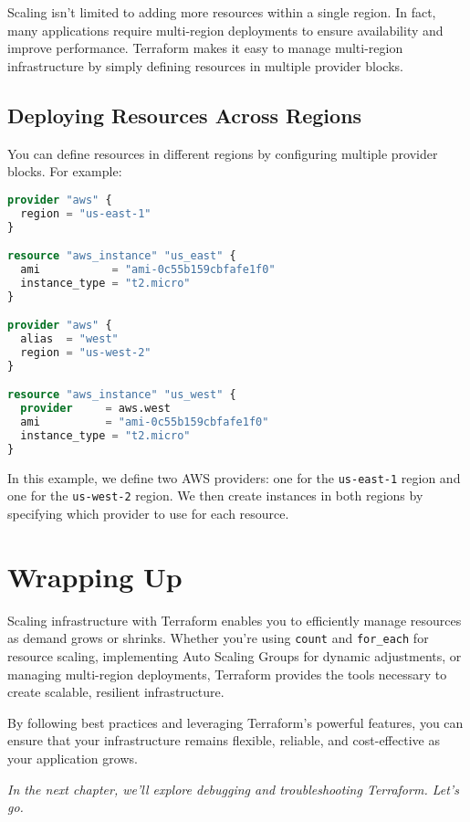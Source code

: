 Scaling isn't limited to adding more resources within a single region. In fact, many applications require multi-region deployments to ensure availability and improve performance. Terraform makes it easy to manage multi-region infrastructure by simply defining resources in multiple provider blocks.

\subsection{Deploying Resources Across Regions}

You can define resources in different regions by configuring multiple provider blocks. For example:

\begin{lstlisting}[language=terraform]
provider "aws" {
  region = "us-east-1"
}

resource "aws_instance" "us_east" {
  ami           = "ami-0c55b159cbfafe1f0"
  instance_type = "t2.micro"
}

provider "aws" {
  alias  = "west"
  region = "us-west-2"
}

resource "aws_instance" "us_west" {
  provider     = aws.west
  ami          = "ami-0c55b159cbfafe1f0"
  instance_type = "t2.micro"
}
\end{lstlisting}

In this example, we define two AWS providers: one for the \texttt{us-east-1} region and one for the \texttt{us-west-2} region. We then create instances in both regions by specifying which provider to use for each resource.

\section{Wrapping Up}

Scaling infrastructure with Terraform enables you to efficiently manage resources as demand grows or shrinks. Whether you're using \texttt{count} and \texttt{for\_each} for resource scaling, implementing Auto Scaling Groups for dynamic adjustments, or managing multi-region deployments, Terraform provides the tools necessary to create scalable, resilient infrastructure.

By following best practices and leveraging Terraform's powerful features, you can ensure that your infrastructure remains flexible, reliable, and cost-effective as your application grows.

\vspace{1em}

\textit{In the next chapter, we'll explore debugging and troubleshooting Terraform. Let's go.}
